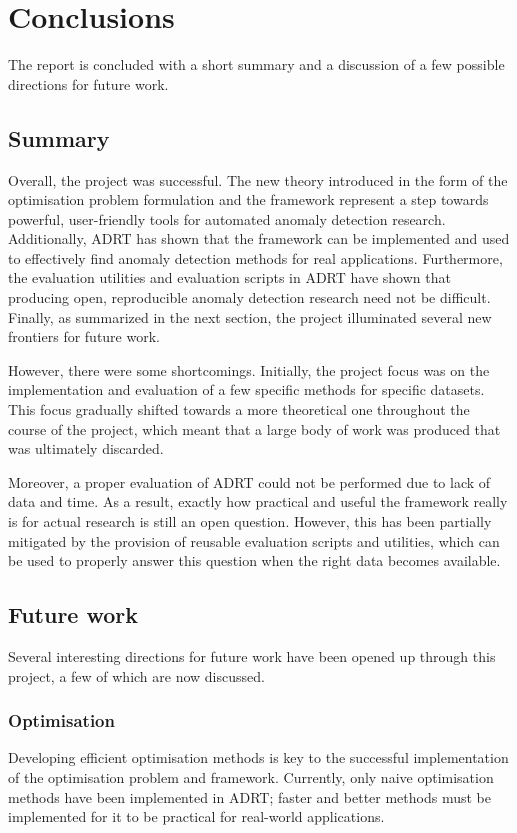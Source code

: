 \chapter{Conclusions}
\label{ch:conclusions}

The report is concluded with a short summary and a discussion of a few possible directions for future work.

\section{Summary}

Overall, the project was successful. The new theory introduced in the form of the optimisation problem formulation and the framework represent a step towards powerful, user-friendly tools for automated anomaly detection research. Additionally, ADRT has shown that the framework can be implemented and used to effectively find anomaly detection methods for real applications. Furthermore, the evaluation utilities and evaluation scripts in ADRT have shown that producing open, reproducible anomaly detection research need not be difficult. Finally, as summarized in the next section, the project illuminated several new frontiers for future work.

However, there were some shortcomings. Initially, the project focus was on the implementation and evaluation of a few specific methods for specific datasets. This focus gradually shifted towards a more theoretical one throughout the course of the project, which meant that a large body of work was produced that was ultimately discarded.

Moreover, a proper evaluation of ADRT could not be performed due to lack of data and time. As a result, exactly how practical and useful the framework really is for actual research is still an open question. However, this has been partially mitigated by the provision of reusable evaluation scripts and utilities, which can be used to properly answer this question when the right data becomes available.

\section{Future work}
Several interesting directions for future work have been opened up through this project, a few of which are now discussed.

\subsection{Optimisation}
Developing efficient optimisation methods is key to the successful implementation of the optimisation problem and framework. Currently, only naive optimisation methods have been implemented in ADRT; faster and better methods must be implemented for it to be practical for real-world applications.

